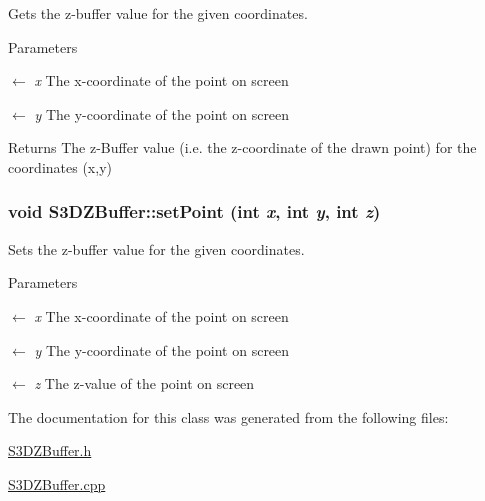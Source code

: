 Gets the z-\/buffer value for the given coordinates. 


\begin{DoxyParams}{Parameters}
\item[\mbox{$\leftarrow$} {\em x}]The x-\/coordinate of the point on screen \item[\mbox{$\leftarrow$} {\em y}]The y-\/coordinate of the point on screen \end{DoxyParams}
\begin{DoxyReturn}{Returns}
The z-\/Buffer value (i.e. the z-\/coordinate of the drawn point) for the coordinates (x,y) 
\end{DoxyReturn}
\hypertarget{class_s3_d_z_buffer_aa712e633bf2ccf4c43bb27178a1692c1}{
\subsubsection[{setPoint}]{\setlength{\rightskip}{0pt plus 5cm}void S3DZBuffer::setPoint (int {\em x}, \/  int {\em y}, \/  int {\em z})}}
\label{class_s3_d_z_buffer_aa712e633bf2ccf4c43bb27178a1692c1}


Sets the z-\/buffer value for the given coordinates. 


\begin{DoxyParams}{Parameters}
\item[\mbox{$\leftarrow$} {\em x}]The x-\/coordinate of the point on screen \item[\mbox{$\leftarrow$} {\em y}]The y-\/coordinate of the point on screen \item[\mbox{$\leftarrow$} {\em z}]The z-\/value of the point on screen \end{DoxyParams}


The documentation for this class was generated from the following files:\begin{DoxyCompactItemize}
\item 
\hyperlink{_s3_d_z_buffer_8h}{S3DZBuffer.h}\item 
\hyperlink{_s3_d_z_buffer_8cpp}{S3DZBuffer.cpp}\end{DoxyCompactItemize}
